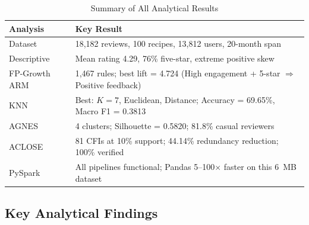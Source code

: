 \documentclass[12pt,a4paper]{article}
\begin{document}
\begin{table}[H]
\centering
\caption{Summary of All Analytical Results}
\label{tab:summary}
\small
\begin{tabularx}{\textwidth}{l X}
\toprule
\textbf{Analysis} & \textbf{Key Result} \\
\midrule
Dataset & 18{,}182 reviews, 100 recipes, 13{,}812 users, 20-month span \\
Descriptive & Mean rating 4.29, 76\% five-star, extreme positive skew \\
FP-Growth ARM & 1{,}467 rules; best lift = 4.724 (High engagement + 5-star $\Rightarrow$ Positive feedback) \\
KNN & Best: $K=7$, Euclidean, Distance; Accuracy = 69.65\%, Macro F1 = 0.3813 \\
AGNES & 4 clusters; Silhouette = 0.5820; 81.8\% casual reviewers \\
ACLOSE & 81 CFIs at 10\% support; 44.14\% redundancy reduction; 100\% verified \\
PySpark & All pipelines functional; Pandas 5--100$\times$ faster on this 6~MB dataset \\
\bottomrule
\end{tabularx}
\end{table}

\subsection{Key Analytical Findings}
\end{document}
